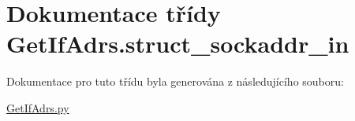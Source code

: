 \hypertarget{classGetIfAdrs_1_1struct__sockaddr__in}{\section{Dokumentace třídy Get\-If\-Adrs.\-struct\-\_\-sockaddr\-\_\-in}
\label{d8/d99/classGetIfAdrs_1_1struct__sockaddr__in}
}


Dokumentace pro tuto třídu byla generována z následujícího souboru\-:\begin{DoxyCompactItemize}
\item 
\hyperlink{GetIfAdrs_8py}{Get\-If\-Adrs.\-py}\end{DoxyCompactItemize}
